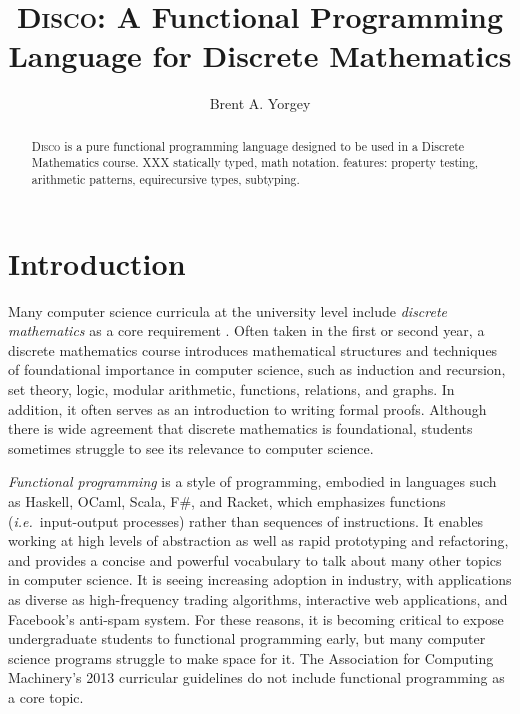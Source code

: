 \documentclass[submission,copyright,creativecommons]{eptcs}
\title{\textsc{Disco}: A Functional Programming Language for Discrete Mathematics}
\author{Brent A. Yorgey
\institute{Hendrix College\\ Conway, Arkansas, USA}
\email{yorgey@hendrix.edu}
}
\newcommand{\disco}{\textsc{Disco}\xspace}
\begin{document}
\maketitle

\begin{abstract}
  \disco is a pure functional programming language designed to be used
  in a Discrete Mathematics course.  XXX statically typed, math
  notation.
  features: property testing, arithmetic patterns, equirecursive
  types, subtyping.
\end{abstract}

\section{Introduction}
\label{sec:introduction}

Many computer science curricula at the university level include
\emph{discrete mathematics} as a core requirement \cite{ACM:2013}.
Often taken in the first or second year, a discrete mathematics course
introduces mathematical structures and techniques of foundational
importance in computer science, such as induction and recursion, set
theory, logic, modular arithmetic, functions, relations, and graphs.
In addition, it often serves as an introduction to writing formal
proofs.  Although there is wide agreement that discrete mathematics is
foundational, students sometimes struggle to see its relevance to
computer science.

\emph{Functional programming} is a style of programming, embodied in
languages such as Haskell, OCaml, Scala, F\#, and Racket, which
emphasizes functions (\emph{i.e.}\ input-output processes) rather than
sequences of instructions. It enables working at high levels of
abstraction as well as rapid prototyping and refactoring, and provides
a concise and powerful vocabulary to talk about many other topics in
computer science. It is seeing increasing adoption in industry, with
applications as diverse as high-frequency trading algorithms,
interactive web applications, and Facebook's anti-spam system.  For
these reasons, it is becoming critical to expose undergraduate
students to functional programming early, but many computer science
programs struggle to make space for it.  The Association for Computing
Machinery's 2013 curricular guidelines \cite{ACM:2013} do not include
functional programming as a core topic.
\end{document}

